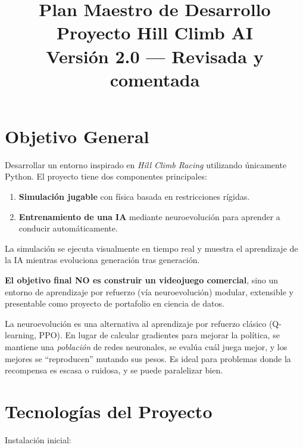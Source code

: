 \documentclass[11pt,a4paper]{article}
\title{\textbf{Plan Maestro de Desarrollo} \\[0.3em] \Large Proyecto Hill Climb AI \\[0.2em] \normalsize Versión 2.0 --- Revisada y comentada}
\author{}
\date{}
\begin{document}
\maketitle
\vspace{-2em}
\tableofcontents
\newpage

\section{Objetivo General}

Desarrollar un entorno inspirado en \textit{Hill Climb Racing} utilizando únicamente Python. El proyecto tiene dos componentes principales:

\begin{enumerate}
    \item \textbf{Simulación jugable} con física basada en restricciones rígidas.
    \item \textbf{Entrenamiento de una IA} mediante neuroevolución para aprender a conducir automáticamente.
\end{enumerate}

La simulación se ejecuta visualmente en tiempo real y muestra el aprendizaje de la IA mientras evoluciona generación tras generación.

\textbf{El objetivo final NO es construir un videojuego comercial}, sino un entorno de aprendizaje por refuerzo (vía neuroevolución) modular, extensible y presentable como proyecto de portafolio en ciencia de datos.

\begin{notabox}
La neuroevolución es una alternativa al aprendizaje por refuerzo clásico (Q-learning, PPO). En lugar de calcular gradientes para mejorar la política, se mantiene una \textit{población} de redes neuronales, se evalúa cuál juega mejor, y los mejores se ``reproducen'' mutando sus pesos. Es ideal para problemas donde la recompensa es escasa o ruidosa, y se puede paralelizar bien.
\end{notabox}

\section{Tecnologías del Proyecto}

Instalación inicial:
\end{document}
